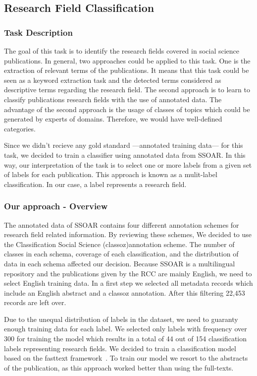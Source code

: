 
\subsection{Research Field Classification}
\label{section:field_classification}
\subsubsection{Task Description}
The goal of this task is to identify the research fields covered in social science publications.
In general, two approaches could be applied to this task. One is the extraction of relevant terms of the publications. It means that this task could be seen as a keyword extraction task and the detected terms considered as descriptive terms regarding the research field. The second approach is to learn to classify publications research fields with the use of annotated data. The advantage of the second approach is the usage of classes of topics which could be generated by experts of domains. Therefore, we would have well-defined categories.

Since we didn't recieve any gold standard ---annotated training data--- for this task, we decided to train a classifier using annotated data from SSOAR.
In this way, our interpretation of the task is to select one or more labels from a given set of labels for each publication. This approach is known as a mulit-label classification. In our case, a label represents a research field.

\subsubsection{Our approach - Overview }
The annotated data of SSOAR contains four different annotation schemes for research field related information. By reviewing these schemes, We decided to use the Classification Social Science (classoz)annotation scheme. The number of classes in each schema, coverage of each classification, and the distribution of data in each schema affected our decision. 
Because SSOAR is a multilingual repository and the publications given by the RCC are mainly English, we need to select English training data.
In a first step we selected all metadata records which include an English abstract and a classoz annotation.
After this filtering 22,453 records are left over.

Due to the unequal distribution of labels in the dataset, we need to guaranty enough training data for each label.
We selected only labels with frequency over 300 for training the model which results in a total of 44 out of 154 classification labels representing research fields.
We decided to train a classification model based on the fasttext framework~\cite{joulin2017bag}. To train our model we resort to the abstracts of the publication, as this approach worked better than using the full-texts.

